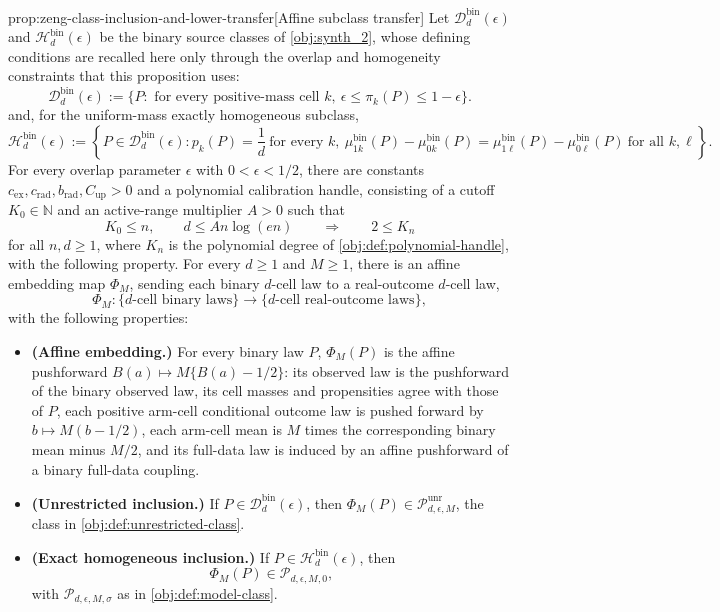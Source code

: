 \begin{propositionv}{prop:zeng-class-inclusion-and-lower-transfer}[Affine subclass transfer]
Let \(\mathcal D_d^{\mathrm{bin}}(\epsilon)\) and \(\mathcal H_d^{\mathrm{bin}}(\epsilon)\) be the binary source classes of \cref{obj:synth_2}, whose defining conditions are recalled here only through the overlap and homogeneity constraints that this proposition uses:
\[
\mathcal D_d^{\mathrm{bin}}(\epsilon)
:=
\{P:\text{ for every positive-mass cell }k,\ 
\epsilon\le \pi_k(P)\le 1-\epsilon\}.
\]
and, for the uniform-mass exactly homogeneous subclass,
\[
\mathcal H_d^{\mathrm{bin}}(\epsilon)
:=
\left\{
P\in\mathcal D_d^{\mathrm{bin}}(\epsilon):
p_k(P)=\frac1d\ \text{for every }k,\ 
\mu_{1k}^{\mathrm{bin}}(P)-\mu_{0k}^{\mathrm{bin}}(P)
=
\mu_{1\ell}^{\mathrm{bin}}(P)-\mu_{0\ell}^{\mathrm{bin}}(P)
\ \text{for all }k,\ell
\right\}.
\]
For every overlap parameter \(\epsilon\) with \(0<\epsilon<1/2\), there are constants
\(c_{\mathrm{ex}},c_{\mathrm{rad}},b_{\mathrm{rad}},C_{\mathrm{up}}>0\) and a polynomial
calibration handle, consisting of a cutoff \(K_0\in\mathbb N\) and an active-range multiplier
\(A>0\) such that
\[
K_0\le n,\qquad d\le A n\log(en)
\qquad\Longrightarrow\qquad
2\le K_n
\]
for all \(n,d\ge1\), where \(K_n\) is the polynomial degree of \cref{obj:def:polynomial-handle}, with the following property.  For every \(d\ge1\) and \(M\ge1\), there is an affine embedding map \(\Phi_M\), sending each binary \(d\)-cell law to a real-outcome \(d\)-cell law,
\[
\Phi_M:\{d\text{-cell binary laws}\}\longrightarrow \{d\text{-cell real-outcome laws}\},
\]
with the following properties:
\begin{itemize}
\item \textbf{(Affine embedding.)} For every binary law \(P\), \(\Phi_M(P)\) is the affine pushforward \(B(a)\mapsto M\{B(a)-1/2\}\): its observed law is the pushforward of the binary observed law, its cell masses and propensities agree with those of \(P\), each positive arm-cell conditional outcome law is pushed forward by \(b\mapsto M(b-1/2)\), each arm-cell mean is \(M\) times the corresponding binary mean minus \(M/2\), and its full-data law is induced by an affine pushforward of a binary full-data coupling.

\item \textbf{(Unrestricted inclusion.)} If \(P\in\mathcal D_d^{\mathrm{bin}}(\epsilon)\), then \(\Phi_M(P)\in\mathcal P_{d,\epsilon,M}^{\mathrm{unr}}\), the class in \cref{obj:def:unrestricted-class}.

\item \textbf{(Exact homogeneous inclusion.)} If \(P\in\mathcal H_d^{\mathrm{bin}}(\epsilon)\), then
\[
\Phi_M(P)\in\mathcal P_{d,\epsilon,M,0},
\]
with \(\mathcal P_{d,\epsilon,M,\sigma}\) as in \cref{obj:def:model-class}.


\end{itemize}
\end{propositionv}
